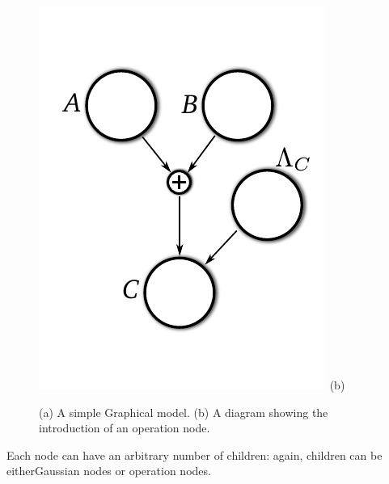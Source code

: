 \documentclass{article}
\newcommand{\<}{\langle}
\renewcommand{\>}{\rangle}
\begin{document}
\begin{figure}
\begin{minipage}{0.4\textwidth}
\begin{center}
\includegraphics[width=\textwidth]{images/gm_bastard}
(b)
\end{center}
\end{minipage}
\caption{(a) A simple Graphical model.  (b) A diagram showing the introduction of an operation node.}
\label{fig:gm_true_bastard}
\end{figure}



Each node can have an arbitrary number of children: again, children can be eitherGaussian nodes or operation nodes. 

\end{document}
